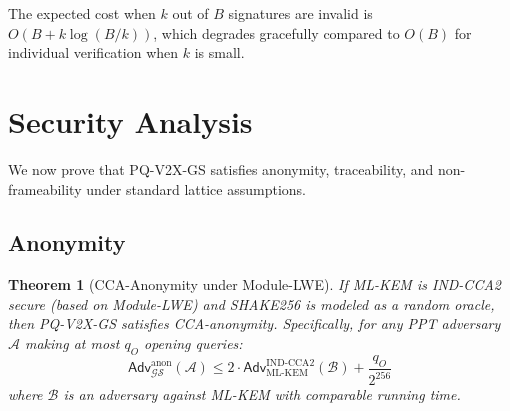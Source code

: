 \documentclass[conference,10pt]{IEEEtran}
\newcommand{\shake}{\textsf{SHAKE256}}
\newcommand{\MLWE}{\textsf{Module-LWE}}
\newcommand{\advA}{\mathcal{A}}
\newcommand{\advB}{\mathcal{B}}
\newtheorem{theorem}{Theorem}
\begin{document}
The expected cost when $k$ out of $B$ signatures are invalid is $O(B + k \log(B/k))$, which degrades gracefully compared to $O(B)$ for individual verification when $k$ is small.

\section{Security Analysis}
\label{sec:security}

We now prove that PQ-V2X-GS satisfies anonymity, traceability, and non-frameability under standard lattice assumptions.

\subsection{Anonymity}

\begin{theorem}[CCA-Anonymity under Module-LWE]
\label{thm:anonymity}
If ML-KEM is IND-CCA2 secure (based on \MLWE{}) and \shake{} is modeled as a random oracle, then PQ-V2X-GS satisfies CCA-anonymity. Specifically, for any PPT adversary $\advA$ making at most $q_O$ opening queries:
\begin{equation}
\mathsf{Adv}^{\mathrm{anon}}_{\mathcal{GS}}(\advA) \leq 2 \cdot \mathsf{Adv}^{\mathrm{IND\text{-}CCA2}}_{\mathrm{ML\text{-}KEM}}(\advB) + \frac{q_O}{2^{256}}
\end{equation}
where $\advB$ is an adversary against ML-KEM with comparable running time.
\end{theorem}
\end{document}
